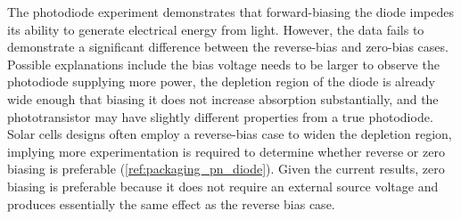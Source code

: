 The photodiode experiment demonstrates that forward-biasing the diode impedes its ability to generate electrical energy from light. However, the data fails to demonstrate a significant difference between the reverse-bias and zero-bias cases. Possible explanations include the bias voltage needs to be larger to observe the photodiode supplying more power, the depletion region of the diode is already wide enough that biasing it does not increase absorption substantially, and the phototransistor may have slightly different properties from a true photodiode. Solar cells designs often employ a reverse-bias case to widen the depletion region, implying more experimentation is required to determine whether reverse or zero biasing is preferable (\ref{ref:packaging_pn_diode}). Given the current results, zero biasing is preferable because it does not require an external source voltage and produces essentially the same effect as the reverse bias case.
